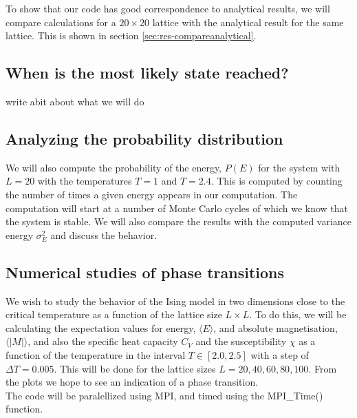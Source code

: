 \documentclass[../main.tex]{subfiles}
\begin{document}


To show that our code has good correspondence to analytical results, we will compare calculations for a $20\times 20$ lattice with the analytical result for the same lattice. This is shown in section \ref{sec:res-compareanalytical}.

\subsection{When is the most likely state reached?}
write abit about what we will do
\subsection{Analyzing the probability distribution}
We will also compute the probability of the energy, $P(E)$ for the system with $L = 20$ with the temperatures $T= 1$ and $T= 2.4$. This is computed by counting the number of times a given energy appears in our computation. The computation will start at a number of Monte Carlo cycles of which we know that the system is stable. We will also compare the results with the computed variance energy $\sigma_E^2$ and discuss the behavior.


\subsection{Numerical studies of phase transitions}
We wish to study the behavior of the Ising model in two dimensions close to the critical temperature as a function of the lattice size $L \times L$.  To do this, we will be calculating the expectation values for energy, $\langle E \rangle$, and absolute magnetisation, $\langle |M| \rangle$, and also the specific heat capacity $C_V$ and the susceptibility $\chi$ as a function of the temperature in the interval $ T \in [2.0,2.5]$ with a step of $\Delta T = 0.005$. This will be done for the lattice sizes $L = {20, 40, 60, 80, 100}$. From the plots we hope to see an indication of a phase transition.\\
The code will be paralellized using MPI, and timed using the MPI\_Time() function.


\end{document}
